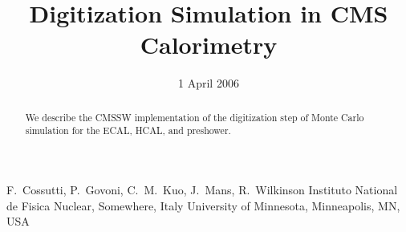 \documentclass{cmspaper}
\begin{document}

\begin{titlepage}

   \date{1 April 2006}

  \title{Digitization Simulation in CMS Calorimetry}

  \begin{Authlist}
     F.~Cossutti, P.~Govoni, C.~M.~Kuo, J.~Mans, R.~Wilkinson
        {Instituto National de Fisica Nuclear, Somewhere, Italy}
        {University of Minnesota, Minneapolis, MN, USA}
  \end{Authlist}



  \begin{abstract}
    We describe the CMSSW implementation of the digitization step of
    Monte Carlo simulation for the ECAL, HCAL, and preshower.
  \end{abstract} 

  
\end{titlepage}

\setcounter{page}{2}%

%
%
%
%
%  
%
\end{document}

